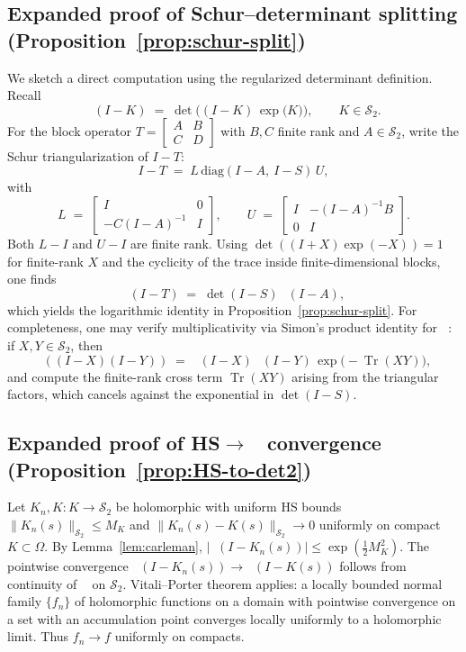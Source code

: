 \documentclass[11pt]{article}
\theoremstyle{definition}
\theoremstyle{remark}
\newcommand{\C}{\mathbb{C}}
\newcommand{\HS}{\mathcal{S}_2}
\DeclareMathOperator{\Tr}{Tr}
\DeclareMathOperator{\dettwo}{det_2}
\begin{document}
\subsection{Expanded proof of Schur--determinant splitting (Proposition~\ref{prop:schur-split})}
We sketch a direct computation using the regularized determinant definition. Recall
\[
 \dettwo(I-K)\;=\;\det\!\Big((I-K)\,\exp\big(K\big)\Big),\qquad K\in\HS.
\]
For the block operator \(T=\begin{bmatrix}A&B\\C&D\end{bmatrix}\) with \(B,C\) finite rank and \(A\in\HS\), write the Schur triangularization of \(I-T\):
\[
 I-T\;=\;L\,\mathrm{diag}(I-A,\ I-S)\,U,
\]
with
\[
 L\;=\;\begin{bmatrix}I & 0\\ -C(I-A)^{-1} & I\end{bmatrix},\qquad U\;=\;\begin{bmatrix}I & -(I-A)^{-1}B\\ 0 & I\end{bmatrix}.
\]
Both \(L-I\) and \(U-I\) are finite rank. Using \(\det((I+X)\exp(-X))=1\) for finite-rank \(X\) and the cyclicity of the trace inside finite-dimensional blocks, one finds
\[
 \dettwo(I-T)\;=\;\det(I-S)\,\dettwo(I-A),
\]
which yields the logarithmic identity in Proposition~\ref{prop:schur-split}. For completeness, one may verify multiplicativity via Simon's product identity for \(\dettwo\): if \(X,Y\in\HS\), then
\[
 \dettwo((I-X)(I-Y))\;=\;\dettwo(I-X)\,\dettwo(I-Y)\,\exp\!\big(-\Tr(XY)\big),
\]
and compute the finite-rank cross term \(\Tr(XY)\) arising from the triangular factors, which cancels against the exponential in \(\det(I-S)\).
\subsection{Expanded proof of HS\(\to\)\(\dettwo\) convergence (Proposition~\ref{prop:HS-to-det2})}
Let \(K_n,K:K\to\HS\) be holomorphic with uniform HS bounds \(\|K_n(s)\|_{\HS}\le M_K\) and \(\|K_n(s)-K(s)\|_{\HS}\to 0\) uniformly on compact \(K\subset\Omega\). By Lemma~\ref{lem:carleman}, \(|\dettwo(I-K_n(s))|\le \exp(\tfrac12 M_K^2)\). The pointwise convergence \(\dettwo(I-K_n(s))\to \dettwo(I-K(s))\) follows from continuity of \(\dettwo\) on \(\HS\). Vitali--Porter theorem applies: a locally bounded normal family \(\{f_n\}\) of holomorphic functions on a domain with pointwise convergence on a set with an accumulation point converges locally uniformly to a holomorphic limit. Thus \(f_n\to f\) uniformly on compacts.
\end{document}

